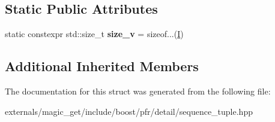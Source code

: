 \subsection*{Static Public Attributes}
\begin{DoxyCompactItemize}
\item 
\mbox{\label{structboost_1_1pfr_1_1detail_1_1sequence__tuple_1_1tuple__base_3_01std_1_1index__sequence_3_01_i6e838f08dd6d8183bf997eb8b11da646_aae1d0aea89cd74c170d8a60d84ec02a8}} 
static constexpr std\+::size\+\_\+t {\bfseries size\+\_\+v} = sizeof...(\mbox{\hyperlink{classinput__iterator}{I}})
\end{DoxyCompactItemize}
\subsection*{Additional Inherited Members}


The documentation for this struct was generated from the following file\+:\begin{DoxyCompactItemize}
\item 
externals/magic\+\_\+get/include/boost/pfr/detail/sequence\+\_\+tuple.\+hpp\end{DoxyCompactItemize}

